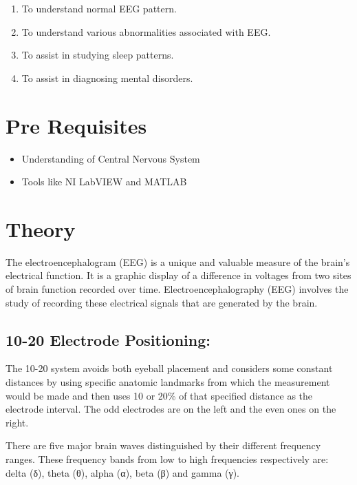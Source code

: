 \documentclass[
  11pt,
  letterpaper,
  DIV=11,
  numbers=noendperiod]{scrreprt}
\providecommand{\tightlist}{%
  \setlength{\itemsep}{0pt}\setlength{\parskip}{0pt}}\usepackage{longtable,booktabs,array}
\begin{document}
\begin{enumerate}
\def\labelenumi{\arabic{enumi}.}
\tightlist
\item
  To understand normal EEG pattern.
\item
  To understand various abnormalities associated with EEG.
\item
  To assist in studying sleep patterns.
\item
  To assist in diagnosing mental disorders.
\end{enumerate}

\section{Pre Requisites}\label{pre-requisites-1}

\begin{itemize}
\tightlist
\item
  Understanding of Central Nervous System
\item
  Tools like NI LabVIEW and MATLAB
\end{itemize}

\section{Theory}\label{theory-6}

The electroencephalogram (EEG) is a unique and valuable measure of the
brain's electrical function. It is a graphic display of a difference in
voltages from two sites of brain function recorded over time.
Electroencephalography (EEG) involves the study of recording these
electrical signals that are generated by the brain.

\subsection{10-20 Electrode Positioning:}\label{electrode-positioning}

The 10-20 system avoids both eyeball placement and considers some
constant distances by using specific anatomic landmarks from which the
measurement would be made and then uses 10 or 20\% of that specified
distance as the electrode interval. The odd electrodes are on the left
and the even ones on the right.

There are five major brain waves distinguished by their different
frequency ranges. These frequency bands from low to high frequencies
respectively are: delta (δ), theta (θ), alpha (α), beta (β) and gamma
(γ).
\end{document}
